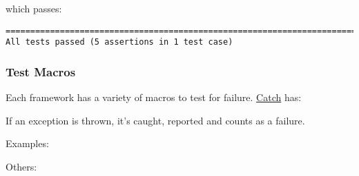 which passes:

\begin{verbatim}
===============================================================================
All tests passed (5 assertions in 1 test case)

\end{verbatim}

\subsubsection{Test Macros}\label{test-macros}

Each framework has a variety of macros to test for failure.
\href{https://github.com/philsquared/Catch}{Catch} has:

\begin{Shaded}
\begin{Highlighting}[]
\end{Highlighting}
\end{Shaded}

If an exception is thrown, it's caught, reported and counts as a
failure.

Examples:

\begin{Shaded}
\begin{Highlighting}[]
     \NormalTok{);}
     \NormalTok{);}
\end{Highlighting}
\end{Shaded}

Others:

\begin{Shaded}
\begin{Highlighting}[]
     
       
\end{Highlighting}
\end{Shaded}

